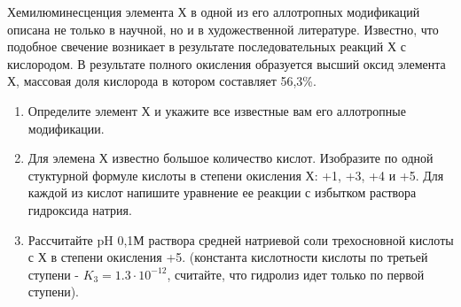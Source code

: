 
Хемилюминесценция элемента Х в одной из его аллотропных модификаций  описана не только в научной, но и в 
художественной литературе. Известно, что подобное свечение возникает в результате последовательных реакций Х с 
кислородом. В результате полного окисления образуется высший оксид элемента Х, массовая доля кислорода в котором 
составляет 56,3\%. 

\begin{enumerate}
    \item Определите элемент Х и укажите все известные вам его аллотропные модификации. 
    \item Для элемена Х известно большое количество кислот. Изобразите по одной стуктурной формуле кислоты в 
    степени окисления Х: +1, +3, +4 и +5. Для каждой из кислот напишите уравнение ее реакции с избытком раствора 
    гидроксида натрия.
    \item Рассчитайте pH 0,1М раствора средней натриевой соли трехосновной кислоты с Х в степени окисления +5. 
    (константа кислотности  кислоты по третьей ступени - $K_3=1.3 \cdot 10^{-12}$, считайте, что гидролиз идет только по первой ступени).   
\end{enumerate}


